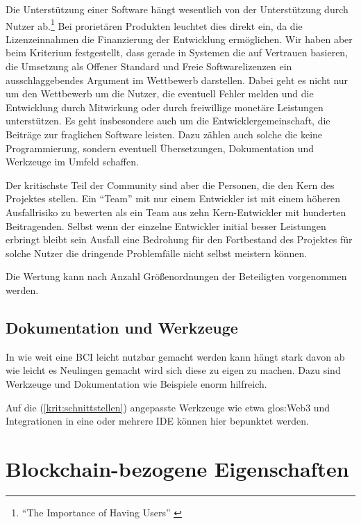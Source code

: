 Die Unterstützung einer Software hängt wesentlich von der Unterstützung durch Nutzer ab.\footnote{\enquote{The Importance of Having Users} \autocite{Raymond:CB}} Bei prorietären Produkten leuchtet dies direkt ein, da die Lizenzeinnahmen die Finanzierung der Entwicklung ermöglichen. Wir haben aber beim Kriterium  festgestellt, dass gerade in Systemen die auf Vertrauen basieren, die Umsetzung als Offener Standard und Freie Softwarelizenzen ein ausschlaggebendes Argument im Wettbewerb darstellen. 
Dabei geht es nicht nur um den Wettbewerb um die Nutzer, die eventuell Fehler melden und die Entwicklung durch Mitwirkung oder durch freiwillige monetäre Leistungen unterstützen. Es geht insbesondere auch um die Entwicklergemeinschaft, die Beiträge zur fraglichen Software leisten. Dazu zählen auch solche die keine Programmierung, sondern eventuell Übersetzungen, Dokumentation und Werkzeuge im Umfeld schaffen.

Der kritischste Teil der Community sind aber die Personen, die den Kern des Projektes stellen. Ein \enquote{Team} mit nur einem Entwickler ist mit einem höheren Ausfallrisiko zu bewerten als ein Team aus zehn Kern-Entwickler mit hunderten Beitragenden. Selbst wenn der einzelne Entwickler initial besser Leistungen erbringt bleibt sein Ausfall eine Bedrohung für den Fortbestand des Projektes für solche Nutzer die dringende Problemfälle nicht selbst meistern können.

Die Wertung kann nach Anzahl Größenordnungen der Beteiligten vorgenommen werden.

\subsection{Dokumentation und Werkzeuge}\label{krit:werkzeuge}

In wie weit eine \gls{BCI} leicht nutzbar gemacht werden kann hängt stark davon ab wie leicht es Neulingen gemacht wird sich diese zu eigen zu machen.
Dazu sind Werkzeuge und Dokumentation wie Beispiele enorm hilfreich.

Auf die  (\ref{krit:schnittstellen}) angepasste Werkzeuge wie etwa \gls{glos:Web3} und Integrationen in eine oder mehrere \gls{IDE} können hier bepunktet werden.

\section{Blockchain-bezogene Eigenschaften}\label{krit:blockchainproperties}

